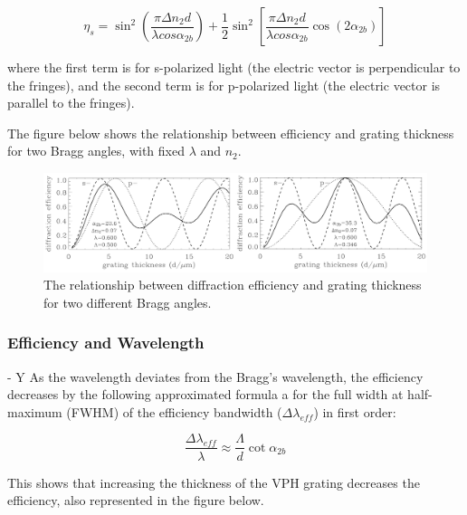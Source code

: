 \begin{equation}
\eta_s = \sin^{2}\left(\frac{\pi \Delta n_2 d}{\lambda cos\alpha_{2b}}\right) + \frac{1}{2} \sin^{2}\left[\frac{\pi \Delta n_2 d}{\lambda cos \alpha_{2b}} \cos(2 \alpha_{2b})\right]
\end{equation}

where the first term is for s-polarized light (the electric vector
is perpendicular to the fringes), and the second term is for p-polarized light (the electric vector is parallel to the fringes).

The figure below shows the relationship between efficiency and grating thickness for two Bragg angles, with fixed $\lambda$ and $n_2$.

\begin{figure}[H]
\centering
\includegraphics[width=\textwidth]{figures/diffraction-efficiency-to-thickness.png}
\caption{The relationship between diffraction efficiency and grating thickness for two different Bragg angles.}
\label{fig:diffraction-efficiency-to-thickness}
\end{figure}

\subsubsection{Efficiency and Wavelength} - Y
As the wavelength deviates from the Bragg's wavelength, the efficiency decreases by the following approximated formula a for the full width at half-maximum (FWHM) of the efficiency bandwidth ($\Delta \lambda_{eff}$) in first order:

\begin{equation}
\frac{\Delta \lambda_{eff}}{\lambda} \approx \frac{\Lambda}{d} \cot \alpha_{2b}
\end{equation}

This shows that increasing the thickness of the VPH grating decreases the efficiency, also represented in the figure below.

